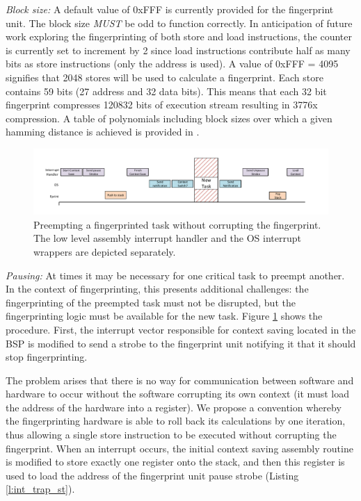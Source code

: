 \emph{Block size:} A default value of 0xFFF is currently provided for the fingerprint unit. The block size \emph{MUST} be odd to function correctly. In anticipation of future work exploring the fingerprinting of both store and load instructions, the counter is currently set to increment by 2 since load instructions contribute half as many bits as store instructions (only the address is used). A value of 0xFFF = 4095 signifies that 2048 stores will be used to calculate a fingerprint. Each store contains 59 bits (27 address and 32 data bits). This means that each 32 bit fingerprint compresses 120832 bits of execution stream resulting in 3776x compression. A table of polynomials including block sizes over which a given hamming distance is achieved is provided in \cite{koopman200232}.
\begin{figure}
\centering
\includegraphics[scale=0.8]{Figures/interrupt}
\caption[Preemption of a fingerprinted task]{Preempting a fingerprinted task without corrupting the fingerprint. The low level assembly interrupt handler and the OS interrupt wrappers are depicted separately.}
\label{f:int}
\end{figure}
\emph{Pausing: } 	At times it may be necessary for one critical task to preempt another. 
	In the context of fingerprinting, this presents additional challenges:
		the fingerprinting of the preempted task must not be disrupted, but the fingerprinting logic must be available for the new task.
	Figure \ref{f:int} shows the procedure.
	First, the interrupt vector responsible for context saving located in the BSP is modified to send a strobe to the fingerprint unit notifying it that it should stop fingerprinting.



	The problem arises that there is no way for communication between software and hardware to occur without the software corrupting its own context (it must load the address of the hardware into a register). 
	We propose a convention whereby the fingerprinting hardware is able to roll back its calculations by one iteration, thus allowing a single store instruction to be executed without corrupting the fingerprint. 
	When an interrupt occurs, the initial context saving assembly routine is modified to store exactly one register onto the stack, and then this register is used to load the address of the fingerprint unit pause strobe (Listing \ref{l:int_trap_st}). 
	
